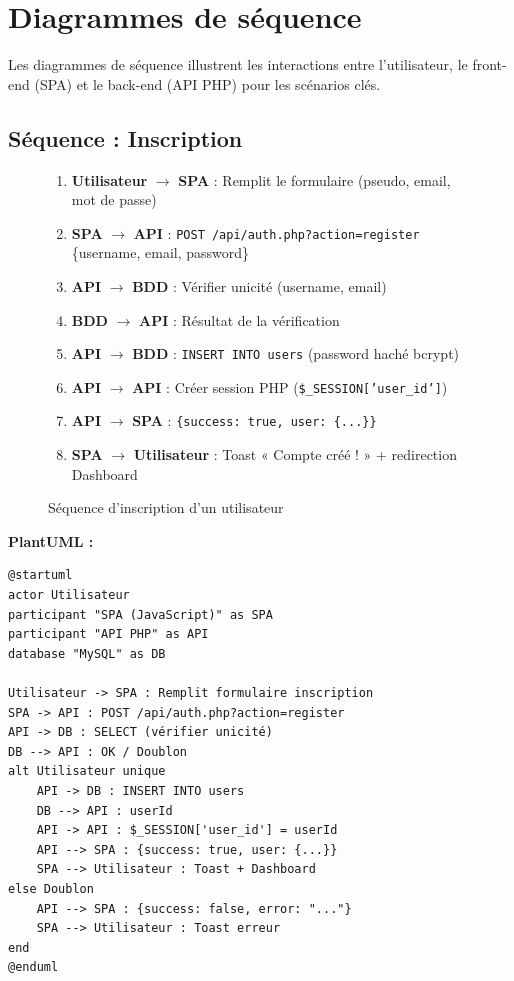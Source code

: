\documentclass[12pt,a4paper]{report}
\begin{document}
\section{Diagrammes de séquence}

Les diagrammes de séquence illustrent les interactions entre l'utilisateur, le front-end (SPA) et le back-end (API PHP) pour les scénarios clés.

\subsection{Séquence : Inscription}

\begin{figure}[H]
    \centering
    \begin{tcolorbox}[colback=codebg, colframe=codeframe, width=\textwidth, title={\textbf{Diagramme de séquence — Inscription}}]
        \small
        \begin{enumerate}[noitemsep]
            \item \textbf{Utilisateur} $\rightarrow$ \textbf{SPA} : Remplit le formulaire (pseudo, email, mot de passe)
            \item \textbf{SPA} $\rightarrow$ \textbf{API} : \texttt{POST /api/auth.php?action=register} \{username, email, password\}
            \item \textbf{API} $\rightarrow$ \textbf{BDD} : Vérifier unicité (username, email)
            \item \textbf{BDD} $\rightarrow$ \textbf{API} : Résultat de la vérification
            \item \textbf{API} $\rightarrow$ \textbf{BDD} : \texttt{INSERT INTO users} (password haché bcrypt)
            \item \textbf{API} $\rightarrow$ \textbf{API} : Créer session PHP (\texttt{\$\_SESSION['user\_id']})
            \item \textbf{API} $\rightarrow$ \textbf{SPA} : \texttt{\{success: true, user: \{...\}\}}
            \item \textbf{SPA} $\rightarrow$ \textbf{Utilisateur} : Toast « Compte créé ! » + redirection Dashboard
        \end{enumerate}
    \end{tcolorbox}
    \caption{Séquence d'inscription d'un utilisateur}
\end{figure}

\noindent
\textbf{PlantUML :}

\begin{verbatim}
@startuml
actor Utilisateur
participant "SPA (JavaScript)" as SPA
participant "API PHP" as API
database "MySQL" as DB

Utilisateur -> SPA : Remplit formulaire inscription
SPA -> API : POST /api/auth.php?action=register
API -> DB : SELECT (vérifier unicité)
DB --> API : OK / Doublon
alt Utilisateur unique
    API -> DB : INSERT INTO users
    DB --> API : userId
    API -> API : $_SESSION['user_id'] = userId
    API --> SPA : {success: true, user: {...}}
    SPA --> Utilisateur : Toast + Dashboard
else Doublon
    API --> SPA : {success: false, error: "..."}
    SPA --> Utilisateur : Toast erreur
end
@enduml
\end{verbatim}
\end{document}
